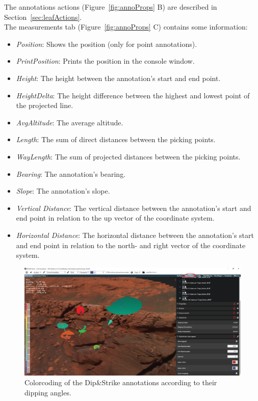 The annotations actions (Figure~\ref{fig:annoProps} B) are described in Section~\ref{sec:leafActions}.\\

The measurements tab (Figure~\ref{fig:annoProps} C) contains some information:
\begin{itemize}
	\item \textit{Position}: Shows the position (only for point annotations).
	\item \textit{PrintPosition}: Prints the position in the console window.
	\item \textit{Height}:  The height between the annotation's start and end point.
	\item \textit{HeightDelta}: The height difference between the highest and lowest point of the projected line.
	\item \textit{AvgAltitude}: The average altitude.
	\item \textit{Length}: The sum of direct distances between the picking points.
	\item \textit{WayLength}: The sum of projected distances between the picking points.
	\item \textit{Bearing}: The annotation's bearing.
	\item \textit{Slope}: The annotation's slope.
	\item \textit{Vertical Distance}: The vertical distance between the annotation's start and end point in relation to the up vector of the coordinate system.
	\item \textit{Horizontal Distance}: The horizontal distance between the annotation's start and end point in relation to the north- and right vector of the coordinate system.
\end{itemize}

\begin{figure}[h]
    	\centering
    		\includegraphics[width=1\textwidth]{pics/DnsAI.png}
    	\caption[Viewer Features DnSColorLegend]{Colorcoding of the Dip\&Strike annotations according to their dipping angles.}
    	\label{fig:dnSColorLegend}
   \end{figure}
	

